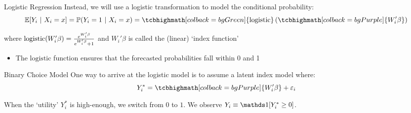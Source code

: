 \documentclass[aspectratio=169,t,11pt,table]{beamer}
\begin{document}
\begin{frame}{Logistic Regression}
  Instead, we will use a \alert{logistic transformation} to model the conditional probability:
  \bigskip
  $$
    \expec{Y_i}{X_i = x} = \prob{Y_i = 1}{X_i = x} = 
    \tcbhighmath[colback = bgGreen]{\textrm{logistic}} 
    \left(\tcbhighmath[colback = bgPurple]{W_i' \beta}\right)
  $$


  \smallskip
  where $\logistic{W_i'\beta} = \frac{e^{W_i'\beta}}{e^{W_i'\beta} + 1}$ and $W_i' \beta$ is called the (linear) `index function'

  \pause
  \begin{itemize}
    \item The $\textrm{logistic}$ function ensures that the forecasted probabilities fall within 0 and 1
  \end{itemize}
\end{frame}


\begin{frame}{Binary Choice Model}
  One way to arrive at the logistic model is to assume a \alert{latent index model} where:
  $$
    Y_{i}^* = \tcbhighmath[colback = bgPurple]{W_i' \beta} + \varepsilon_i
  $$

  \bigskip
  When the `utility' $Y_i^*$ is high-enough, we switch from $0$ to $1$. 
  We observe $Y_i \equiv \one{Y_i^* \geq 0}$.
\end{frame}
\end{document}
